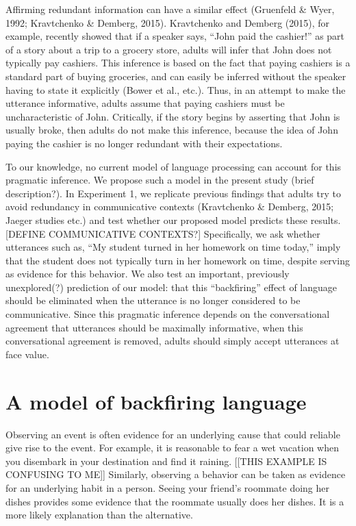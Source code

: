 \documentclass[10pt,letterpaper]{article}
\begin{document}
Affirming redundant information can have a similar effect (Gruenfeld & Wyer, 1992; Kravtchenko & Demberg, 2015).  Kravtchenko and Demberg (2015), for example, recently showed that if a speaker says, “John paid the cashier!” as part of a story about a trip to a grocery store, adults will infer that John does not typically pay cashiers.  This inference is based on the fact that paying cashiers is a standard part of buying groceries, and can easily be inferred without the speaker having to state it explicitly (Bower et al., etc.).  Thus, in an attempt to make the utterance informative, adults assume that paying cashiers must be uncharacteristic of John.  Critically, if the story begins by asserting that John is usually broke, then adults do not make this inference, because the idea of John paying the cashier is no longer redundant with their expectations.

To our knowledge, no current model of language processing can account for this pragmatic inference.  We propose such a model in the present study (brief description?).  In Experiment 1, we replicate previous findings that adults try to avoid redundancy in communicative contexts (Kravtchenko & Demberg, 2015; Jaeger studies etc.) and test whether our proposed model predicts these results.  [DEFINE COMMUNICATIVE CONTEXTS?] Specifically, we ask whether utterances such as, “My student turned in her homework on time today,” imply that the student does not typically turn in her homework on time, despite serving as evidence for this behavior.  We also test an important, previously unexplored(?) prediction of our model: that this “backfiring” effect of language should be eliminated when the utterance is no longer considered to be communicative.  Since this pragmatic inference depends on the conversational agreement that utterances should be maximally informative, when this conversational agreement is removed, adults should simply accept utterances at face value.



\section{A model of backfiring language}

Observing an event is often evidence for an underlying cause that could reliable give rise to the event.
For example, it is reasonable to fear a wet vacation when you disembark in your destination and find it raining.  [[THIS EXAMPLE IS CONFUSING TO ME]]
Similarly, observing a behavior can be taken as evidence for an underlying habit in a person. 
Seeing your friend's roommate doing her dishes provides some evidence that the roommate usually does her dishes. 
It is a more likely explanation than the alternative.
\end{document}
